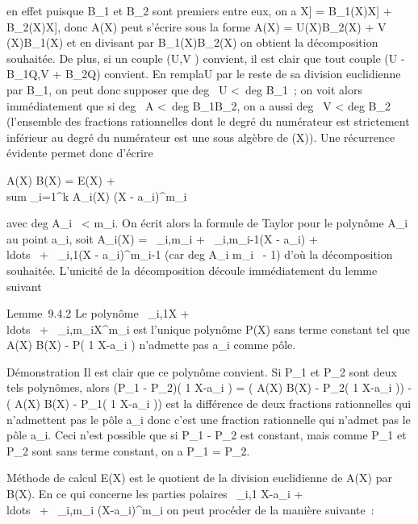 \documentclass[]{article}
\begin{document}
en effet puisque B\_1 et B\_2 sont premiers entre eux,
on a \mathbb{C}{[}X{]} = B\_1(X)\mathbb{C}{[}X{]} + B\_2(X)\mathbb{C}{[}X{]}, donc
A(X) peut s'écrire sous la forme A(X) = U(X)B\_2(X) + V
(X)B\_1(X) et en divisant par B\_1(X)B\_2(X) on
obtient la décomposition souhaitée. De plus, si un couple (U,V )
convient, il est clair que tout couple (U - B\_1Q,V +
B\_2Q) convient. En rempla\ccant U par le
reste de sa division euclidienne par B\_1, on peut donc supposer
que deg~ U \textless{}\
deg B\_1~; on voit alors immédiatement que si
deg~ A \textless{}\
deg B\_1B\_2, on a aussi deg~
V \textless{} deg B\_2~ (l'ensemble des
fractions rationnelles dont le degré du numérateur est strictement
inférieur au degré du numérateur est une sous algèbre de (X)). Une
récurrence évidente permet donc d'écrire

 A(X) \over B(X) = E(X) + \\sum
\_i=1^k A\_i(X) \over (X -
a\_i)^m\_i

avec deg A\_i~ \textless{}
m\_i. On écrit alors la formule de Taylor pour le polynôme
A\_i au point a\_i, soit A\_i(X) =
\alpha~\_i,m\_i + \alpha~\_i,m\_i-1(X -
a\_i) +
\\ldots~ +
\alpha~\_i,1(X - a\_i)^m\_i-1 (car
deg A\_i \leq m\_i~ - 1) d'où la
décomposition souhaitée. L'unicité de la décomposition découle
immédiatement du lemme suivant

Lemme~9.4.2 Le polynôme \alpha~\_i,1X +
\\ldots~ +
\alpha~\_i,m\_iX^m\_i est l'unique polynôme
P(X) sans terme constant tel que  A(X) \over B(X) -
P( 1 \over X-a\_i ) n'admette pas
a\_i comme pôle.

Démonstration Il est clair que ce polynôme convient. Si P\_1 et
P\_2 sont deux tels polynômes, alors (P\_1 -
P\_2)( 1 \over X-a\_i ) =
\left ( A(X) \over B(X) -
P\_2( 1 \over X-a\_i
)\right ) -\left ( A(X)
\over B(X) - P\_1( 1 \over
X-a\_i )\right ) est la différence de deux
fractions rationnelles qui n'admettent pas le pôle a\_i donc
c'est une fraction rationnelle qui n'admet pas le pôle a\_i.
Ceci n'est possible que si P\_1 - P\_2 est constant,
mais comme P\_1 et P\_2 sont sans terme constant, on a
P\_1 = P\_2.

Méthode de calcul E(X) est le quotient de la division euclidienne de
A(X) par B(X). En ce qui concerne les parties polaires  \alpha~\_i,1
\over X-a\_i +
\\ldots~ +
\alpha~\_i,m\_i \over
(X-a\_i)^m\_i on peut procéder de la
manière suivante~:
\end{document}
